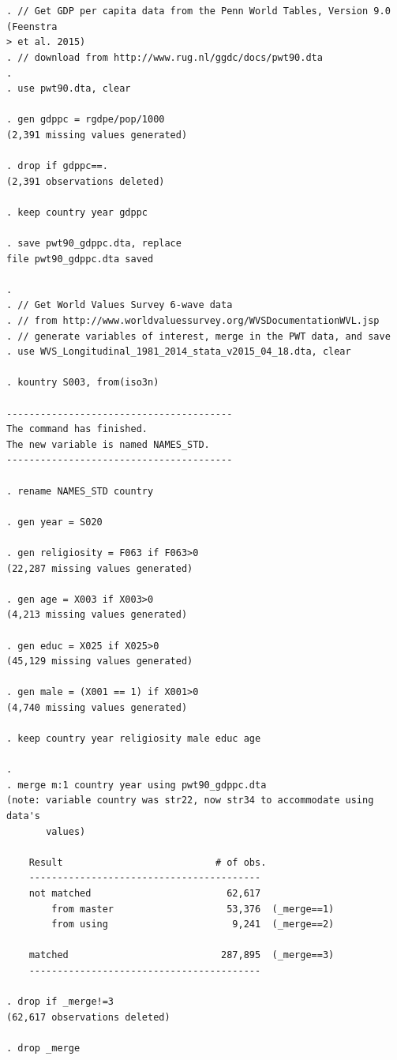 \documentclass[11pt,]{article}
\theoremstyle{definition}
\theoremstyle{definition}
\theoremstyle{remark}
\begin{document}
\begin{verbatim}


. // Get GDP per capita data from the Penn World Tables, Version 9.0 (Feenstra 
> et al. 2015)
. // download from http://www.rug.nl/ggdc/docs/pwt90.dta
. 
. use pwt90.dta, clear

. gen gdppc = rgdpe/pop/1000
(2,391 missing values generated)

. drop if gdppc==.
(2,391 observations deleted)

. keep country year gdppc

. save pwt90_gdppc.dta, replace
file pwt90_gdppc.dta saved

. 
. // Get World Values Survey 6-wave data 
. // from http://www.worldvaluessurvey.org/WVSDocumentationWVL.jsp
. // generate variables of interest, merge in the PWT data, and save
. use WVS_Longitudinal_1981_2014_stata_v2015_04_18.dta, clear

. kountry S003, from(iso3n)

----------------------------------------
The command has finished.
The new variable is named NAMES_STD.
----------------------------------------

. rename NAMES_STD country

. gen year = S020

. gen religiosity = F063 if F063>0
(22,287 missing values generated)

. gen age = X003 if X003>0
(4,213 missing values generated)

. gen educ = X025 if X025>0
(45,129 missing values generated)

. gen male = (X001 == 1) if X001>0
(4,740 missing values generated)

. keep country year religiosity male educ age

. 
. merge m:1 country year using pwt90_gdppc.dta
(note: variable country was str22, now str34 to accommodate using data's
       values)

    Result                           # of obs.
    -----------------------------------------
    not matched                        62,617
        from master                    53,376  (_merge==1)
        from using                      9,241  (_merge==2)

    matched                           287,895  (_merge==3)
    -----------------------------------------

. drop if _merge!=3
(62,617 observations deleted)

. drop _merge


\end{verbatim}
\end{document}
